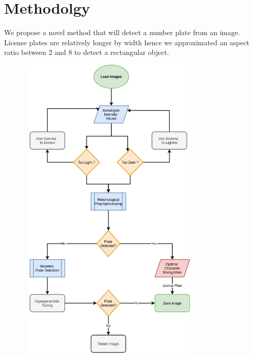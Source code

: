 \documentclass[a4paper,twoside,10pt]{report}
\begin{document}


\chapter{Methodolgy}
We propose a novel method that will detect a number plate from an image.
License plates are relatively longer by width hence we approximated an aspect ratio between 2 and 8 to detect a rectangular object.

\begin{center}
  \includegraphics[width=11cm,height=15cm]{images/Methodology.png}
\end{center}
\end{document}
